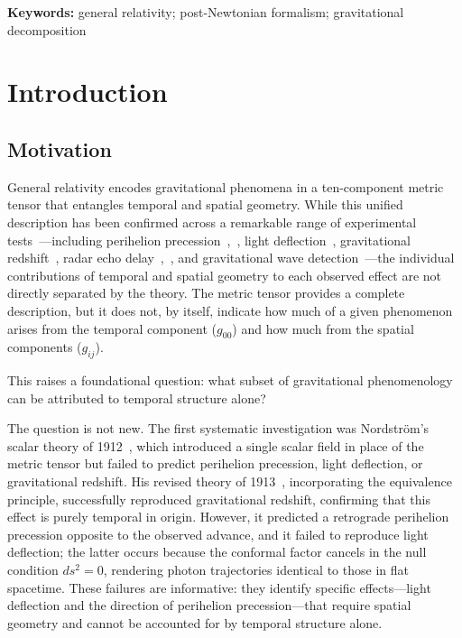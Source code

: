 \documentclass[12pt]{article}
\begin{document}
\noindent\textbf{Keywords:} general relativity; post-Newtonian formalism; gravitational decomposition


\section{Introduction}

\subsection{Motivation}

General relativity encodes gravitational phenomena in a ten-component metric tensor that entangles temporal and spatial geometry. While this unified description has been confirmed across a remarkable range of experimental tests~\cite{Will2014}---including perihelion precession~\cite{Einstein1915},~\cite{Park2017}, light deflection~\cite{Dyson1920}, gravitational redshift~\cite{Pound1959}, radar echo delay~\cite{Shapiro1964},~\cite{Bertotti2003}, and gravitational wave detection~\cite{Abbott2016}---the individual contributions of temporal and spatial geometry to each observed effect are not directly separated by the theory. The metric tensor provides a complete description, but it does not, by itself, indicate how much of a given phenomenon arises from the temporal component ($g_{00}$) and how much from the spatial components ($g_{ij}$).

This raises a foundational question: what subset of gravitational phenomenology can be attributed to temporal structure alone?

The question is not new. The first systematic investigation was Nordstr\"om's scalar theory of 1912~\cite{Nordstrom1912}, which introduced a single scalar field in place of the metric tensor but failed to predict perihelion precession, light deflection, or gravitational redshift. His revised theory of 1913~\cite{Nordstrom1913}, incorporating the equivalence principle, successfully reproduced gravitational redshift, confirming that this effect is purely temporal in origin. However, it predicted a retrograde perihelion precession opposite to the observed advance, and it failed to reproduce light deflection; the latter occurs because the conformal factor cancels in the null condition $ds^2 = 0$, rendering photon trajectories identical to those in flat spacetime. These failures are informative: they identify specific effects---light deflection and the direction of perihelion precession---that require spatial geometry and cannot be accounted for by temporal structure alone.
\end{document}
